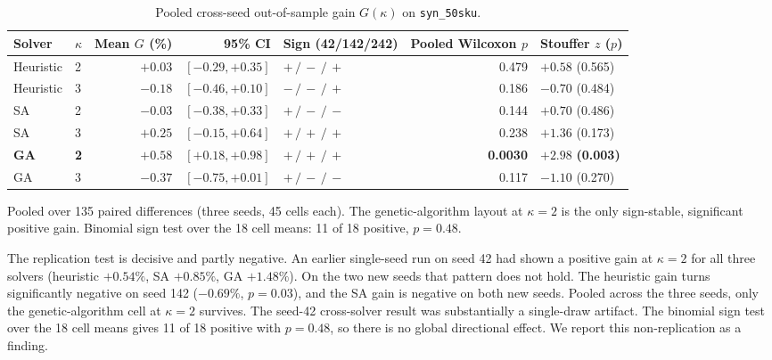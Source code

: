 \documentclass[preprint,review,11pt,authoryear]{elsarticle}
\begin{document}
\begin{table}[t]
  \centering
  \small
  \begin{threeparttable}
  \begin{tabular}{@{}llrrlrl@{}}
    \toprule
    Solver & $\kappa$ & Mean $G$ (\%) & 95\% CI & Sign (42/142/242) & Pooled Wilcoxon $p$ & Stouffer $z$ ($p$) \\
    \midrule
    Heuristic & 2 & $+0.03$ & $[-0.29,+0.35]$ & $+\,/\,-\,/\,+$ & 0.479 & $+0.58$ (0.565) \\
    Heuristic & 3 & $-0.18$ & $[-0.46,+0.10]$ & $-\,/\,-\,/\,+$ & 0.186 & $-0.70$ (0.484) \\
    SA        & 2 & $-0.03$ & $[-0.38,+0.33]$ & $+\,/\,-\,/\,-$ & 0.144 & $+0.70$ (0.486) \\
    SA        & 3 & $+0.25$ & $[-0.15,+0.64]$ & $+\,/\,+\,/\,+$ & 0.238 & $+1.36$ (0.173) \\
    \textbf{GA} & \textbf{2} & $\mathbf{+0.58}$ & $\mathbf{[+0.18,+0.98]}$ & $\mathbf{+\,/\,+\,/\,+}$ & \textbf{0.0030} & $\mathbf{+2.98}$ \textbf{(0.003)} \\
    GA        & 3 & $-0.37$ & $[-0.75,+0.01]$ & $+\,/\,-\,/\,-$ & 0.117 & $-1.10$ (0.270) \\
    \bottomrule
  \end{tabular}
  \begin{tablenotes}\footnotesize
    \item Pooled over 135 paired differences (three seeds, 45 cells each). The genetic-algorithm layout at $\kappa=2$ is the only sign-stable, significant positive gain. Binomial sign test over the 18 cell means: 11 of 18 positive, $p=0.48$.
  \end{tablenotes}
  \end{threeparttable}
  \caption{Pooled cross-seed out-of-sample gain $G(\kappa)$ on \texttt{syn\_50sku}.}
  \label{tab:rc-pooled}
\end{table}

The replication test is decisive and partly negative. An earlier single-seed run on seed 42 had shown a positive gain at $\kappa=2$ for all three solvers (heuristic $+0.54\%$, SA $+0.85\%$, GA $+1.48\%$). On the two new seeds that pattern does not hold. The heuristic gain turns significantly negative on seed 142 ($-0.69\%$, $p=0.03$), and the SA gain is negative on both new seeds. Pooled across the three seeds, only the genetic-algorithm cell at $\kappa=2$ survives. The seed-42 cross-solver result was substantially a single-draw artifact. The binomial sign test over the 18 cell means gives 11 of 18 positive with $p=0.48$, so there is no global directional effect. We report this non-replication as a finding.
\end{document}
